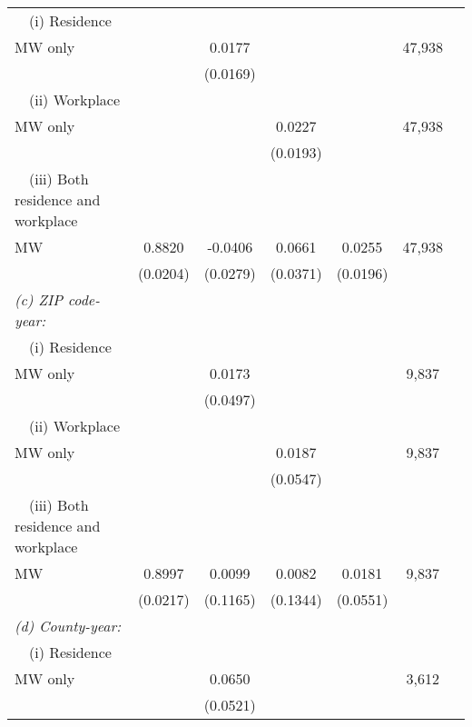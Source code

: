 \begin{table}
\begin{tabular}{@{}lcccccc@{}}
        $\quad$(i) Residence \\MW only                       &       &  0.0177  &       &       & 47,938 \\
                                                             &       & (0.0169) &       &       &      \\
        $\quad$(ii) Workplace \\MW only                      &       &       &  0.0227  &       & 47,938 \\
                                                             &       &       & (0.0193) &       &      \\
        $\quad$(iii) Both residence and workplace \\MW       &  0.8820  &  -0.0406  &  0.0661  &  0.0255  & 47,938 \\
                                                             & (0.0204) & (0.0279) & (0.0371) & (0.0196) &      \\
        \textit{(c) ZIP code-year:}                          &       &       &       &       &      \\
        $\quad$(i) Residence \\MW only                       &       &  0.0173  &       &       & 9,837 \\
                                                             &       & (0.0497) &       &       &      \\
        $\quad$(ii) Workplace \\MW only                      &       &       &  0.0187  &       & 9,837 \\
                                                             &       &       & (0.0547) &       &      \\
        $\quad$(iii) Both residence and workplace \\MW       &  0.8997  &  0.0099  &  0.0082  &  0.0181  & 9,837 \\
                                                             & (0.0217) & (0.1165) & (0.1344) & (0.0551) &      \\
         \textit{(d) County-year:}                           &       &       &       &       &      \\
        $\quad$(i) Residence \\MW only                       &       &  0.0650  &       &       & 3,612 \\
                                                             &       & (0.0521) &       &       &      \\

\end{tabular}
\end{table}
